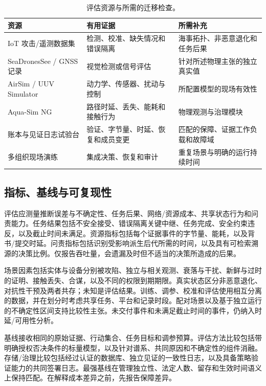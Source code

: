 \begin{table}[H]\small
\caption{评估资源与所需的迁移检查。}\label{tab:evaluation}
\begin{tabularx}{\textwidth}{LLL}\toprule
\textbf{资源} & \textbf{有用证据} & \textbf{所需补充}\\\midrule
IoT 攻击/遥测数据集 & 检测、校准、缺失情况和错误隔离 & 海事拓扑、非恶意退化和任务后果\\
SeaDronesSee / GNSS 记录 & 视觉检测或信号评估 & 针对所述物理主张的独立真实值\\
AirSim / UUV Simulator & 动力学、传感器、扰动与控制 & 所配置模型的现场有效性\\
Aqua-Sim NG & 路径时延、丢失、能耗和接触行为 & 物理观测与治理模块\\
账本与见证日志试验台 & 验证、字节量、时延、恢复和成员变更 & 匹配的保障、证据工作负载和故障域\\
多组织现场演练 & 集成决策、恢复和审计 & 重复场景与明确的运行持续时间\\\bottomrule
\end{tabularx}\end{table}

\subsection{指标、基线与可复现性}

评估应测量推断误差与不确定性、任务后果、网络/资源成本、共享状态行为和问责能力。任务结果包括不安全接受、错误隔离关键中继、任务完成、安全约束违反，以及截止时间未满足。资源指标包括每个证据事件的字节量、能耗，以及背书/提交时延。问责指标包括识别受影响派生后代所需的时间，以及具有可检索溯源的决策比例。仅报告吞吐量，会遗漏及时但不适当的决策所造成的后果。

场景因素包括实体与设备分别被攻陷、独立与相关观测、衰落与干扰、新鲜与过时的证明、接触丢失、合谋，以及不同的权限到期期限。真实状态区分非恶意退化、对抗性干预及两者共存；未知是评估结果。训练、调参、校准和评估使用相互分离的数据，并在划分时考虑共享任务、平台和记录时段。配对场景以及基于独立运行的不确定性区间支持比较性主张。未交付事件和未满足截止时间的事件，仍纳入时延/可用性分析。

基线接收相同的原始证据、行动集合、任务目标和调参预算。评估方法比较包括带明确授权否决条件的标量模型，以及针对谱系、共同原因和不确定性的组件消融。存储/治理比较包括经过认证的数据库、独立见证的一致性日志，以及具备策略验证能力的共同签署日志。最强基线在管理独立性、法定人数、留存和生效时间语义上保持匹配。在解释成本差异之前，先报告保障差异。

